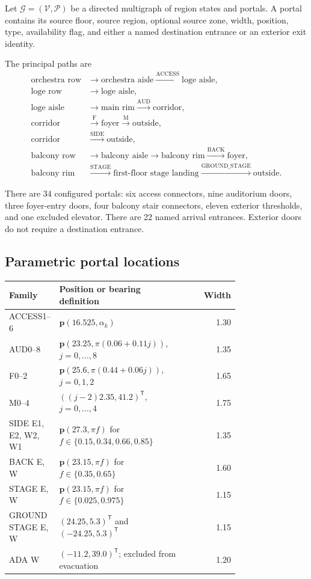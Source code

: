 \documentclass[11pt]{article}
\begin{document}
Let $\mathcal G=(\mathcal V,\mathcal P)$ be a directed multigraph of region
states and portals. A portal contains its source floor, source region,
optional source zone, width, position, type, availability flag, and either a
named destination entrance or an exterior exit identity.

The principal paths are
\begin{align*}
 \text{orchestra row}&\longrightarrow\text{orchestra aisle}
 \xrightarrow{\mathrm{ACCESS}}\text{loge aisle},\\
 \text{loge row}&\longrightarrow\text{loge aisle}
 ,\\
 \text{loge aisle}&\longrightarrow\text{main rim}
 \xrightarrow{\mathrm{AUD}}\text{corridor},\\
 \text{corridor}&\xrightarrow{\mathrm F}\text{foyer}
 \xrightarrow{\mathrm M}\text{outside},\\
 \text{corridor}&\xrightarrow{\mathrm{SIDE}}\text{outside},\\
 \text{balcony row}&\longrightarrow\text{balcony aisle}
 \longrightarrow\text{balcony rim}
 \xrightarrow{\mathrm{BACK}}\text{foyer},\\
 \text{balcony rim}&\xrightarrow{\mathrm{STAGE}}
       \text{first-floor stage landing}
 \xrightarrow{\mathrm{GROUND\_STAGE}}\text{outside}.
\end{align*}

There are 34 configured portals: six access connectors, nine auditorium doors,
three foyer-entry doors, four balcony stair connectors, eleven exterior
thresholds, and one excluded elevator. There are 22 named arrival entrances.
Exterior doors do not require a destination entrance.

\subsection{Parametric portal locations}

\begin{longtable}{p{0.20\linewidth}p{0.56\linewidth}r}
\toprule
Family & Position or bearing definition & Width\\
\midrule
\endhead
ACCESS1--6 & $\mathbf p(16.525,\alpha_k)$ & 1.30\\
AUD0--8 & $\mathbf p(23.25,\pi(0.06+0.11j))$, $j=0,\ldots,8$ & 1.35\\
F0--2 & $\mathbf p(25.6,\pi(0.44+0.06j))$, $j=0,1,2$ & 1.65\\
M0--4 & $((j-2)2.35,41.2)^{\mathsf T}$, $j=0,\ldots,4$ & 1.75\\
SIDE E1, E2, W2, W1 & $\mathbf p(27.3,\pi f)$ for $f\in\{0.15,0.34,0.66,0.85\}$ & 1.35\\
BACK E, W & $\mathbf p(23.15,\pi f)$ for $f\in\{0.35,0.65\}$ & 1.60\\
STAGE E, W & $\mathbf p(23.15,\pi f)$ for $f\in\{0.025,0.975\}$ & 1.15\\
GROUND STAGE E, W & $(24.25,5.3)^{\mathsf T}$ and $(-24.25,5.3)^{\mathsf T}$ & 1.15\\
ADA W & $(-11.2,39.0)^{\mathsf T}$; excluded from evacuation & 1.20\\
\bottomrule
\end{longtable}
\end{document}
